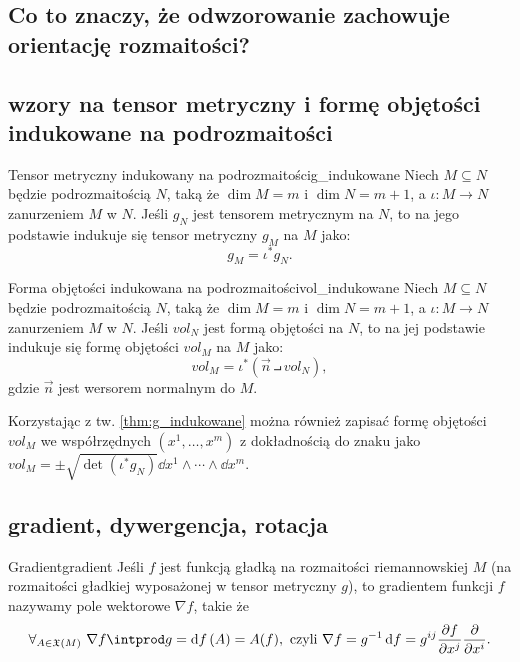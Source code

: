 \documentclass{article}
\begin{document}
\subsection{Co to znaczy, że odwzorowanie zachowuje orientację rozmaitości?}\label{sec:orientacja}

\subsection{wzory na tensor metryczny i formę objętości indukowane na podrozmaitości}\label{sec:indukowane_g_vol}


\begin{tw}{Tensor metryczny indukowany na podrozmaitości}{g_indukowane}
Niech $M\subseteq N$ będzie podrozmaitością $N$, taką że $\dim{M}=m$ i $\dim{N}=m+1$, a $\iota\!:M\to N$ zanurzeniem $M$ w $N$. Jeśli $g_N$ jest tensorem metrycznym na $N$, to na jego podstawie indukuje się tensor metryczny $g_M$ na $M$ jako:
\[
g_M = \iota^* g_N.
\]
\end{tw}

\begin{tw}{Forma objętości indukowana na podrozmaitości}{vol_indukowane}
  Niech $M\subseteq N$ będzie podrozmaitością $N$, taką że $\dim{M}=m$ i $\dim{N}=m+1$, a $\iota\!:M\to N$ zanurzeniem $M$ w $N$. Jeśli ${vol}_N$ jest formą objętości na $N$, to na jej podstawie indukuje się formę objętości ${vol}_M$ na $M$ jako:
  \[
  {vol}_M = \iota^*(\vec{n}\intprod {vol}_N),
  \]
  gdzie $\vec{n}$ jest wersorem normalnym do $M$.
\end{tw}

Korzystając z tw. \ref{thm:g_indukowane} można również zapisać formę objętości ${vol}_M$ we współrzędnych $(x^1,\ldots,x^m)$ z dokładnością do znaku jako ${vol}_M=\pm\sqrt{\det(\iota^* g_N)}\dd{x^1}\wedge\cdots\wedge\dd{x^m}$.




















\subsection{gradient, dywergencja, rotacja}\label{sec:operatory_różniczkowe}

\begin{dfn}{Gradient}{gradient}
  Jeśli $f$ jest funkcją gładką na rozmaitości riemannowskiej $M$ (na rozmaitości gładkiej wyposażonej w tensor metryczny $g$), to gradientem funkcji $f$ nazywamy pole wektorowe $\nabla{f}$, takie że
  \[
  \forall_{A\in\mathfrak{X}(M)}\ \nabla{f}\intprod g = \dd{f}(A) = A(f),\text{ czyli } \nabla{f} = g^{-1}\dd{f} = g^{ij}\pdv{f}{x^j}\pdv{x^i}.
  \]
\end{dfn}
\end{document}
